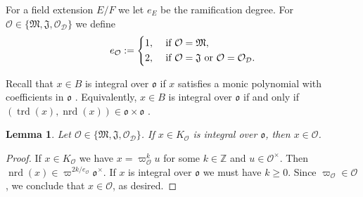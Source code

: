 \documentclass{article}
\newtheorem{lem}{Lemma}[section]
\theoremstyle{named}
\newcommand{\D}{\mathcal{D}}
\newcommand{\Z}{\mathbb{Z}}
\newcommand{\M}{\mathfrak{M}}
\newcommand{\J}{\mathfrak{J}}
\renewcommand{\O}{\mathcal{O}}
\renewcommand{\o}{\mathfrak{o}}
\DeclareMathOperator{\nrd}{nrd}
\DeclareMathOperator{\trd}{trd}
\begin{document}
For a field extension $E/F$ we let $e_E$ be the ramification degree. For $\O \in \{\M, \J, \O_\D\}$ we define  
\begin{equation*}
    e_\O := \begin{dcases}
        1, & \text{ if }\O = \M,\\
        2, & \text{ if }\O = \J \text{ or }\O = \O_\D.
    \end{dcases}
\end{equation*}

Recall that $x \in B$ is integral over $\o$ if $x$ satisfies a monic polynomial with coefficients in $\o$ \cite[Definition 10.3.1]{voight}. Equivalently, $x \in B$ is integral over $\o$ if and only if $(\trd(x), \nrd(x)) \in \o \times \o$ \cite[Corollary 10.3.6]{voight}. 


\begin{lem}\label{lem:integralelementsnormalizer}
Let $\O \in \{\M, \J, \O_\D\}$. If $x \in K_\O$ is integral over $\o$, then $x \in \O$.  
\end{lem}
\begin{proof}
If $x \in K_{\O}$ we have $x = \varpi_\O^{k} u$ for some $k \in \Z$ and $u \in \O^\times$. Then $\nrd(x) \in \varpi^{2k/e_\O} \o^\times$. If $x$ is integral over $\o$ we must have $k \geq 0$. Since $\varpi_\O \in \O$, we conclude that $x \in \O$, as desired.
\end{proof}
\end{document}
